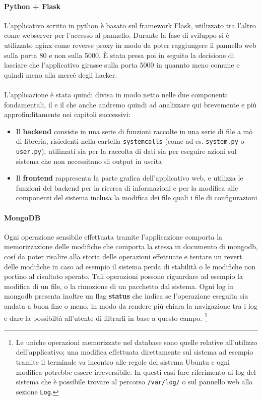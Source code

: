 \documentclass[11pt]{article}
\begin{document}
\paragraph{Python + Flask}
L'applicativo scritto in python è basato sul framework Flask, utilizzato tra l'altro come webserver per l'accesso al pannello.
Durante la fase di sviluppo si è utilizzato nginx come reverse proxy in modo da poter raggiungere il pannello web sulla porta 80 e non sulla 5000.
È stata presa poi in seguito la decisione di lasciare che l'applicativo girasse sulla porta 5000 in quannto meno comune e quindi
meno alla mercé degli hacker.
\\~\\
L'applicazione è stata quindi divisa in modo netto nelle due componenti fondamentali, il  e il 
che anche andremo quindi ad analizzare qui brevemente e più approfinditamente nei capitoli successivi:
\begin{itemize}
	\label{backendintro}
	\item{
			Il \textbf{backend} consiste in una serie di funzioni raccolte in una serie di file a mò di libreria,
			risiedenti nella cartella \texttt{systemcalls} (come ad es. \texttt{system.py} o \texttt{user.py}), utilizzati
			sia per la raccolta di dati sia per eseguire azioni sul sistema che non necessitano di output in uscita}
	\label{frontendintro}
	\item{
			Il \textbf{frontend} rappresenta la parte grafica dell'applicativo web, e utilizza le funzioni
			del backend per la ricerca di informazioni e per la modifica alle componenti del sistema
			inclusa la modifica dei file quali i file di configurazioni}
\end{itemize}

\paragraph{MongoDB}
Ogni operazione sensibile effettuata tramite l'applicazione comporta la memorizzazione delle modifiche che comporta la stessa
in documento di mongodb, cos\'i da poter risalire alla storia delle operazioni effettuate e tentare un revert delle modifiche
in caso ad esempio il sistema perda di stabilità o le modifiche non portino al risultato sperato.
Tali operazioni possono riguardare ad esempio la modifica di un file, o la rimozione di un pacchetto dal sistema.
Ogni log in mongodb presenta inoltre un flag \textbf{status} che indica se l'operazione eseguita sia andata a buon fine
o meno, in modo da rendere più chiara la navigazione tra i log e dare la possibiltà all'utente di filtrarli in base a questo campo.
\footnote{\label{loglimit1}
Le uniche operazioni memorizzate nel database sono quelle relative all'utilizzo dell'applicativo;
una modifica effettuata direttamente sul sistema ad esempio tramite il terminale va incontro alle regole del sistema Ubuntu
e ogni modifica potrebbe essere irreversibile. In questi casi fare riferimento ai log del sistema che è possibile trovare
al percorso \texttt{/var/log/} o sul pannello web alla sezione \texttt{Log}. }
\end{document}
